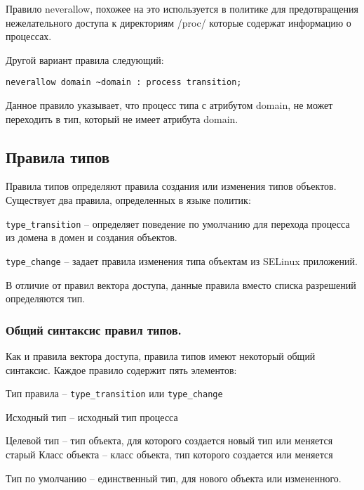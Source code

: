 \documentclass{./../class/UIR}
\begin{document}
    Правило neverallow, похожее на это используется в политике для
    предотвращения нежелательного доступа к директориям /proc/ которые содержат
    информацию о процессах.

    Другой вариант правила следующий:
\begin{verbatim}
neverallow domain ~domain : process transition;
\end{verbatim}
    Данное правило указывает, что процесс типа с атрибутом domain, не может
    переходить в тип, который не имеет атрибута domain.

\subsection{Правила типов}

    Правила типов определяют  правила создания или изменения типов объектов.
    Существует два правила, определенных в языке политик:

    \begin{description}
      \item \verb"type_transition" – определяет поведение по умолчанию для
      перехода процесса из домена в домен и создания объектов.
      \item \verb"type_change" – задает правила изменения типа объектам из
      SELinux приложений.
    \end{description}

    В отличие от правил вектора доступа, данные правила вместо списка разрешений
    определяются тип.

\subsubsection{Общий синтаксис правил типов.}

    Как и правила вектора доступа, правила типов имеют некоторый общий
    синтаксис. Каждое правило содержит пять элементов:
    \begin{description}
      \item Тип правила – \verb"type_transition" или \verb"type_change"
      \item Исходный тип – исходный тип процесса
      \item Целевой тип – тип объекта, для которого создается новый тип или
      меняется старый Класс объекта – класс объекта, тип которого создается или
      меняется
      \item Тип по умолчанию – единственный тип, для нового объекта или
      измененного.
    \end{description}
\end{document}
